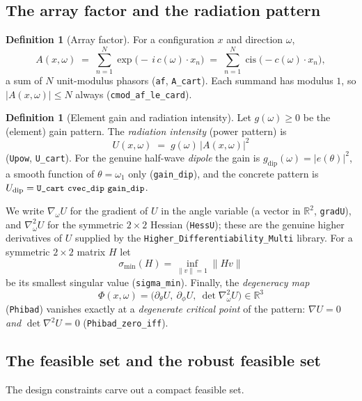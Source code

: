 \documentclass[11pt]{article}
\theoremstyle{plain}
\theoremstyle{definition}
\newtheorem{definition}[theorem]{Definition}
\theoremstyle{remark}
\newcommand{\RR}{\mathbb{R}}
\newcommand{\cvec}{c}                 %
\newcommand{\Af}{A}                   %
\newcommand{\Upat}{U}                 %
\newcommand{\gain}{g}                 %
\newcommand{\grad}{\nabla}
\newcommand{\sigmin}{\sigma_{\min}}
\newcommand{\code}[1]{\texttt{\small #1}}
\newcommand{\norm}[1]{\lVert #1 \rVert}
\newcommand{\abs}[1]{\lvert #1 \rvert}
\DeclareMathOperator{\cis}{cis}
\begin{document}
\subsection{The array factor and the radiation pattern}

\begin{definition}[Array factor]\label{def:af}
For a configuration $x$ and direction $\omega$,
\[
  \Af(x,\omega)\;=\;\sum_{n=1}^{N}\exp\!\big(-\,i\,\cvec(\omega)\cdot x_n\big)
            \;=\;\sum_{n=1}^{N}\cis\!\big(-\cvec(\omega)\cdot x_n\big),
\]
a sum of $N$ unit-modulus phasors (\code{af}, \code{A\_cart}).  Each summand has
modulus $1$, so $\abs{\Af(x,\omega)}\le N$ always (\code{cmod\_af\_le\_card}).
\end{definition}

\begin{definition}[Element gain and radiation intensity]
Let $\gain(\omega)\ge 0$ be the (element) gain pattern.  The \emph{radiation
intensity} (power pattern) is
\[
  \Upat(x,\omega)\;=\;\gain(\omega)\,\abs{\Af(x,\omega)}^2
\]
(\code{Upow}, \code{U\_cart}).  For the genuine half-wave \emph{dipole} the gain
is $\gain_{\mathrm{dip}}(\omega)=\abs{e(\theta)}^2$, a smooth function of
$\theta=\omega_1$ only (\code{gain\_dip}), and the concrete pattern is
$U_{\mathrm{dip}}=\code{U\_cart}\ \code{cvec\_dip}\ \code{gain\_dip}$.
\end{definition}

We write $\grad_\omega\Upat$ for the gradient of $\Upat$ in the angle variable
(a vector in $\RR^2$, \code{gradU}), and $\grad^2_\omega\Upat$ for the symmetric
$2\times2$ Hessian (\code{HessU}); these are the genuine higher derivatives of
$\Upat$ supplied by the \code{Higher\_Differentiability\_Multi} library.  For a
symmetric $2\times2$ matrix $H$ let
\[
  \sigmin(H)=\inf_{\norm v=1}\norm{Hv}
\]
be its smallest singular value (\code{sigma\_min}).  Finally, the
\emph{degeneracy map}
\[
  \Phi(x,\omega)=\big(\partial_\theta\Upat,\ \partial_\phi\Upat,\
       \det\grad^2_\omega\Upat\big)\in\RR^3
\]
(\code{Phibad}) vanishes exactly at a \emph{degenerate critical point} of the
pattern: $\grad\Upat=0$ \emph{and} $\det\grad^2\Upat=0$
(\code{Phibad\_zero\_iff}).

\subsection{The feasible set and the robust feasible set}

The design constraints carve out a compact feasible set.
\end{document}
